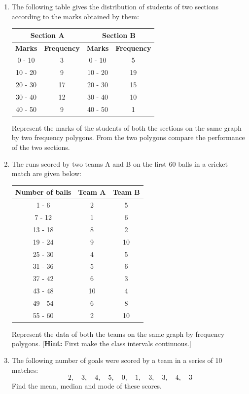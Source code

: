 \documentclass[a4paper,leqno,12pt]{amsart}
\begin{document}
\begin{enumerate}
\item The following table gives the distribution of students of two sections according to
the marks obtained by them:

\begin{center}
 \begin{tabular}{|c|c|c|c|}
 \hline
 \multicolumn{2}{|c|}{\textbf{Section A}} & \multicolumn{2}{|c|}{\textbf{Section B}} \\
 \hline
 \textbf{Marks} & \textbf{Frequency} & \textbf{Marks} & \textbf{Frequency} \\
 \hline
 0 - 10 & 3 & 0 - 10 & 5 \\
10 - 20 & 9 & 10 - 20 & 19 \\
20 - 30 & 17 & 20 - 30 &15 \\
30 - 40 & 12 & 30 - 40 &10 \\
40 - 50 & 9 & 40 - 50 & 1 \\
 \hline
 \end{tabular}
\end{center}
Represent the marks of the students of both the sections on the same graph by two
frequency polygons. From the two polygons compare the performance of the two
sections.

\item The runs scored by two teams A and B on the first 60 balls in a cricket match are given
below:

\begin{center}
 \begin{tabular}{|c|c|c|}
  \hline
  \textbf{Number of balls} & \textbf{Team A} & \textbf{Team B} \\
  \hline 
  1 - 6 & 2 & 5 \\
  7 - 12 & 1 & 6 \\
 13 - 18 & 8 & 2 \\
 19 - 24 & 9 & 10 \\
 25 - 30 & 4 & 5 \\
 31 - 36 & 5 & 6 \\
 37 - 42 & 6 & 3 \\
 43 - 48 & 10 & 4 \\
 49 - 54 & 6 & 8 \\
 55 - 60 & 2 & 10 \\
 \hline
 \end{tabular}
\end{center}
Represent the data of both the teams on the same graph by frequency polygons.
[\textbf{Hint:} First make the class intervals continuous.] 

\item The following number of goals were scored by a team in a series of 10 matches:
\[
2, \quad 3, \quad 4, \quad 5, \quad 0, \quad 1, \quad 3, \quad 3, \quad 4, \quad 3
\]
Find the mean, median and mode of these scores.


\end{enumerate}
\end{document}
